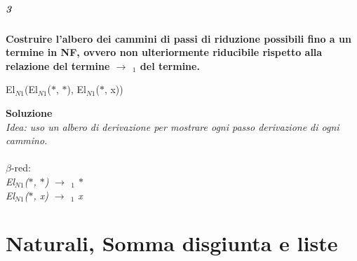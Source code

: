 \documentclass[10pt,a4paper, italian]{book}
\begin{document}
{{\paragraph{3}
\textbf{Costruire l'albero dei cammini di passi di riduzione  possibili fino a un termine in NF, ovvero non ulteriormente riducibile rispetto alla relazione del termine $\rightarrow$ $_1$ del termine.}
\begin{center}
El$_{N1}$(El$_{N1}$($\ast$, $\ast$), El$_{N1}$($\ast$, x))
\end{center}
\textbf{Soluzione}\\
\textit{Idea: uso un albero di derivazione per mostrare ogni passo derivazione di ogni cammino.}\\\\
$\beta$-red:\\
\textit{El$_{N1}$($\ast$, $\ast$) $\rightarrow$ $_1$ $\ast$}\\
\textit{El$_{N1}$($\ast$, x) $\rightarrow$ $_1$ x}

\begin{prooftree}
\end{prooftree}


































\chapter{Naturali, Somma disgiunta e liste}

}}
\end{document}
